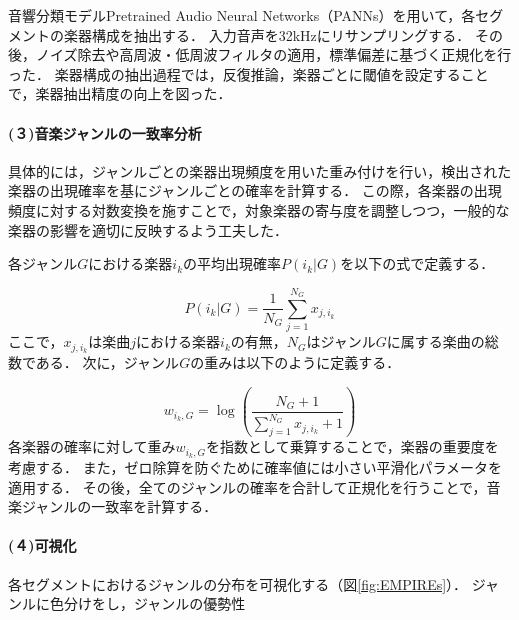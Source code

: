 音響分類モデルPretrained Audio Neural Networks（PANNs）\cite{PANNs}を用いて，各セグメントの楽器構成を抽出する．
入力音声を32kHzにリサンプリングする．
その後，ノイズ除去や高周波・低周波フィルタの適用，標準偏差に基づく正規化を行った．
楽器構成の抽出過程では，反復推論，楽器ごとに閾値を設定することで，楽器抽出精度の向上を図った．


\sectionmargin
\paragraph*{(３)音楽ジャンルの一致率分析}

具体的には，ジャンルごとの楽器出現頻度を用いた重み付けを行い，検出された楽器の出現確率を基にジャンルごとの確率を計算する．
この際，各楽器の出現頻度に対する対数変換を施すことで，対象楽器の寄与度を調整しつつ，一般的な楽器の影響を適切に反映するよう工夫した．

各ジャンル$G$における楽器$i_k$の平均出現確率$P(i_k|G)$を以下の式で定義する．

\begin{equation}
	P(i_k | G) = \frac{1}{N_G} \sum_{j=1}^{N_G} x_{j, i_k}
\end{equation}
%
ここで，$x_{j, i_k}$は楽曲$j$における楽器$i_k$の有無，$N_G$はジャンル$G$に属する楽曲の総数である．
次に，ジャンル$G$の重みは以下のように定義する．

\begin{equation}
	w_{i_k, G} = \log \left( \frac{N_G + 1}{\sum_{j=1}^{N_G} x_{j, i_k} + 1} \right)
\end{equation}
%
各楽器の確率に対して重み$w_{i_k, G}$を指数として乗算することで，楽器の重要度を考慮する．
また，ゼロ除算を防ぐために確率値には小さい平滑化パラメータを適用する．
%
その後，全てのジャンルの確率を合計して正規化を行うことで，音楽ジャンルの一致率を計算する．

\sectionmargin
\paragraph*{(４)可視化}

各セグメントにおけるジャンルの分布を可視化する（図\ref{fig:EMPIREs}）．
ジャンルに色分けをし，ジャンルの優勢性%


